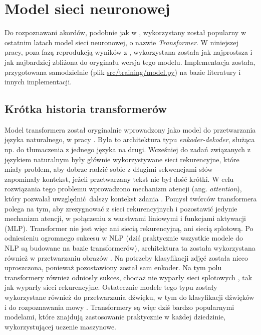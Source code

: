 \section{Model sieci neuronowej}

Do rozpoznawani akordów, podobnie jak w \cite{park_bi-directional_2019}, wykorzystany został popularny w ostatnim latach model sieci neuronowej, o nazwie \emph{Transformer}. W niniejszej pracy, poza fazą reprodukcją wyników z \cite{park_bi-directional_2019}, wykorzystana została jak najprostsza i jak najbardziej zbliżona do oryginału wersja tego modelu. Implementacja została, przygotowana samodzielnie (plik \url{src/training/model.py}) na bazie literatury i innych implementacji.


\subsection{Krótka historia transformerów}

Model transformera został oryginalnie wprowadzony jako model do przetwarzania języka naturalnego, w pracy \cite{vaswani_attention_2017}. Była to architektura typu \emph{enkoder-dekoder}, służąca np.  do tłumaczenia z jednego języka na drugi. Wcześniej do zadań związanych z językiem naturalnym były głównie wykorzystywane sieci rekurencyjne, które miały problem, aby dobrze radzić sobie z długimi sekwencjami słów --- zapominały kontekst, jeżeli przetwarzany tekst nie był dość krótki. W celu rozwiązania tego problemu wprowadzono mechanizm atencji (ang. \emph{attention}), który pozwalał uwzględnić dalszy kontekst zdania \cite{bahdanau_neural_2016}. Pomysł twórców transformera polega na tym, aby zrezygnować z sieci rekurencyjnych i pozostawić jedynie mechanizm atencji, w połączeniu z warstwami liniowymi i funkcjami aktywacji (MLP). Transformer nie jest więc ani siecią rekurencyjną, ani siecią splotową. Po odniesieniu ogromnego sukcesu w NLP (dziś praktycznie wszystkie modele do NLP są budowane na bazie transformerów), architektura ta została wykorzystana również w przetwarzaniu obrazów \cite{dosovitskiy_image_2021}. Na potrzeby klasyfikacji zdjęć została nieco uproszczona, ponieważ pozostawiony został sam enkoder. Na tym polu transformery również odniosły sukces, chociaż nie wyparły sieci splotowych \cite{liu_convnet_2022}, tak jak wyparły sieci rekurencyjne. Ostatecznie modele tego typu zostały wykorzystane również do przetwarzania dźwięku, w tym do klasyfikacji dźwięków \cite{gong_ast_2021} i do rozpoznawania mowy \cite{kim_squeezeformer_2022}. Transformery są więc dziś bardzo popularnymi modelami, które znajdują zastosowanie praktycznie w każdej dziedzinie, wykorzystującej uczenie maszynowe.

